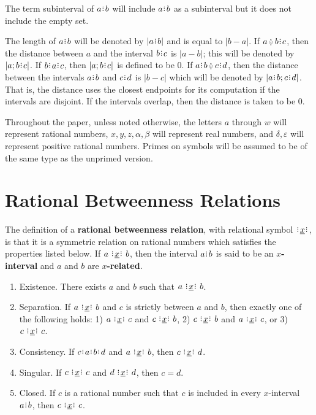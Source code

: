 \documentclass[12pt]{article}
\begin{document}
The term subinterval of $a\rint b$ will include $a\rint b$ as a subinterval but it does not include the empty set. 

The length of $a\rint b$ will be denoted by $|a\rint b|$ and is equal to $|b-a|$. If $a \betneq b \rint c$, then the distance between $a$ and the interval $b \rint c$ is $|a-b|$; this will be denoted by $|a; b\rint c|$. If $b\rint a\rint c$, then $|a; b\rint c|$ is defined to be $0$. If $a \rint b \betneq c \rint d$, then the distance between the intervals $a \rint b$  and $c \rint d$ is $|b-c|$ which will be denoted by $|a\rint b; c\rint d|$.  That is, the distance uses the closest endpoints for its computation if the intervals are disjoint. If the intervals overlap, then the distance is taken to be $0$. 

Throughout the paper, unless noted otherwise, the letters $a$ through $w$ will represent rational numbers, $x, y, z, \alpha, \beta$ will represent real numbers, and $\delta, \varepsilon$ will represent positive rational numbers. Primes on symbols will be assumed to be of the same type as the unprimed version. 

\section{Rational Betweenness Relations}

The definition of a \textbf{rational betweenness relation}, with relational symbol $\xrel$, is that it is a symmetric relation on rational numbers which satisfies the properties listed below. If $a \xrel b$, then the interval $a\rint b$ is said to be an \textbf{$x$-interval} and $a$ and $b$ are \textbf{$x$-related}.
\begin{enumerate}
    \item Existence. There exists $a$ and $b$ such that $a\xrel b$.
    \item Separation. If $a \xrel b$ and $c$ is strictly between $a$ and $b$, then exactly one of the following holds:  1) $a \xrel c$ and \sout{$c \xrel b$}, 2) $c \xrel b$ and \sout{$a \xrel c$}, or 3) $c \xrel c$. 
    \item Consistency. If $c \rint  a \rint  b \rint  d$ and $a \xrel b$, then $c \xrel d$. 
    \item Singular. If $c \xrel c$ and $d \xrel d$, then $c=d$. 
    \item Closed. If $c$ is a rational number such that $c$ is included in every $x$-interval $a\rint b$, then  $c \xrel c$. 
\end{enumerate}
\end{document}
